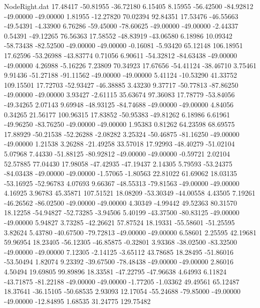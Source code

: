 \begin{filecontents}{NodeRight.dat}
  17.48417  -50.81955  -36.72180     6.15405    8.15955  -56.42500  -84.92812  -49.00000  -49.00000    1.81955  -12.27820   70.02394   92.84351
  17.53476  -46.55663  -49.54391    -4.33900    6.76286  -59.45000  -78.60625  -49.00000  -49.00000   -2.44337    0.54391  -49.12265   76.56363
  17.58552  -48.83919  -43.06580     6.18986   10.09342  -58.73438  -82.52500  -49.00000  -49.00000   -0.16081   -5.93420   65.12148  106.18951
  17.62596  -53.26988  -43.83774     0.71056    6.90611  -54.32812  -84.63438  -49.00000  -49.00000    4.26988   -5.16226    7.23809   70.34923
  17.67656  -54.41124  -38.46710     3.75461    9.91436  -51.27188  -91.11562  -49.00000  -49.00000    5.41124  -10.53290   41.33752  109.15501
  17.72703  -52.93427  -46.38885     3.43230    9.37717  -50.77813  -87.86250  -49.00000  -49.00000    3.93427   -2.61115   35.63674   97.36083
  17.78779  -53.84056  -49.34265     2.07143    9.69948  -48.93125  -84.74688  -49.00000  -49.00000    4.84056    0.34265   21.56177  100.96315
  17.83852  -50.95383  -49.81262     6.18986    6.61961  -49.96250  -83.76250  -49.00000  -49.00000    1.95383    0.81262   64.23598   68.69575
  17.88929  -50.21538  -52.26288    -2.08282    3.25324  -50.46875  -81.16250  -49.00000  -49.00000    1.21538    3.26288  -21.49258   33.57018
  17.92993  -48.40279  -51.02104     5.07968    7.44330  -51.88125  -80.92812  -49.00000  -49.00000   -0.59721    2.02104   52.57885   77.04430
  17.98058  -47.42935  -47.19437     2.14305    5.79593  -53.24375  -84.03438  -49.00000  -49.00000   -1.57065   -1.80563   22.81022   61.69062
  18.03135  -53.16925  -52.96783     4.07693    9.66367  -48.55313  -79.81563  -49.00000  -49.00000    4.16925    3.96783   45.35871  107.51521
  18.08209  -53.30349  -44.00558     4.43505    7.19261  -46.26562  -86.02500  -49.00000  -49.00000    4.30349   -4.99442   49.52363   80.31570
  18.12258  -54.94827  -52.73285    -3.94506    5.40199  -43.37500  -80.83125  -49.00000  -49.00000    5.94827    3.73285  -42.26621   57.87524
  18.19331  -55.58601  -51.25595     3.82624    5.43780  -40.67500  -79.72813  -49.00000  -49.00000    6.58601    2.25595   42.19681   59.96954
  18.23405  -56.12305  -46.85875    -0.32801    3.93368  -38.02500  -83.32500  -49.00000  -49.00000    7.12305   -2.14125   -3.65112   43.78685
  18.28495  -51.86016  -53.50494     1.82074    9.23392  -39.67500  -78.48438  -49.00000  -49.00000    2.86016    4.50494   19.69805   99.89896
  18.33581  -47.22795  -47.96638     4.64993    6.11824  -43.71875  -81.22188  -49.00000  -49.00000   -1.77205   -1.03362   49.49561   65.12487
  18.37641  -36.15105  -50.68535     2.93093   12.17054  -55.24688  -79.85000  -49.00000  -49.00000  -12.84895    1.68535   31.24775  129.75482

\end{filecontents}
